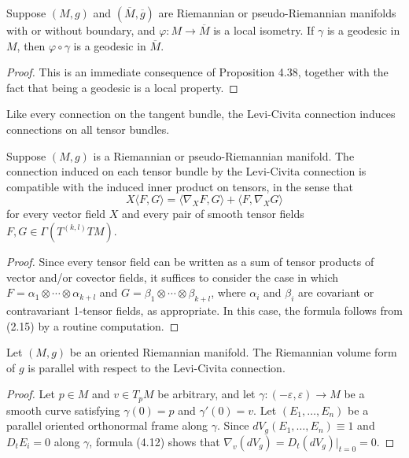 \begin{corollary}
\label{cor:naturality-geodesics}

Suppose $(M,g)$ and $(\overline{M},\overline{g})$ are Riemannian or pseudo-Riemannian manifolds with or without boundary, and $\varphi: M \to \overline{M}$ is a local isometry. If $\gamma$ is a geodesic in $M$, then $\varphi \circ \gamma$ is a geodesic in $\overline{M}$.

\begin{proof}
This is an immediate consequence of Proposition 4.38, together with the fact that being a geodesic is a local property.
\end{proof}
\end{corollary}

Like every connection on the tangent bundle, the Levi-Civita connection induces connections on all tensor bundles.

\begin{proposition}
\label{prop:levi-civita-tensor-compatibility}

Suppose $(M,g)$ is a Riemannian or pseudo-Riemannian manifold. The connection induced on each tensor bundle by the Levi-Civita connection is compatible with the induced inner product on tensors, in the sense that
\[
X \langle F, G \rangle = \langle \nabla_X F, G \rangle + \langle F, \nabla_X G \rangle
\]
for every vector field $X$ and every pair of smooth tensor fields $F,G \in \Gamma(T^{(k,l)}TM)$.
\end{proposition}

\begin{proof}
Since every tensor field can be written as a sum of tensor products of vector and/or covector fields, it suffices to consider the case in which $F = \alpha_1 \otimes \cdots \otimes \alpha_{k+l}$ and $G = \beta_1 \otimes \cdots \otimes \beta_{k+l}$, where $\alpha_i$ and $\beta_i$ are covariant or contravariant 1-tensor fields, as appropriate. In this case, the formula follows from (2.15) by a routine computation.
\end{proof}

\begin{proposition}
\label{prop:riemannian-volume-form-parallel}

Let $(M, g)$ be an oriented Riemannian manifold. The Riemannian volume form of $g$ is parallel with respect to the Levi-Civita connection.

\begin{proof}
Let $p \in M$ and $v \in T_p M$ be arbitrary, and let $\gamma: (-\varepsilon, \varepsilon) \to M$ be a smooth curve satisfying $\gamma(0) = p$ and $\gamma'(0) = v$. Let $(E_1, \ldots, E_n)$ be a parallel oriented orthonormal frame along $\gamma$. Since $dV_g(E_1, \ldots, E_n) \equiv 1$ and $D_t E_i = 0$ along $\gamma$, formula (4.12) shows that $\nabla_v(dV_g) = D_t(dV_g)|_{t=0} = 0$.
\end{proof}
\end{proposition}

